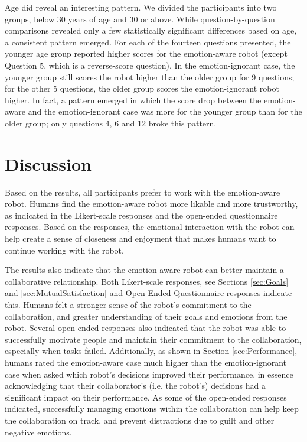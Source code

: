 \documentclass[12pt]{report}
\begin{document}
Age did reveal an interesting pattern. We divided the participants into two
groups, below 30 years of age and 30 or above. While question-by-question
comparisons revealed only a few statistically significant differences based on
age, a consistent pattern emerged. For each of the fourteen questions presented,
the younger age group reported higher scores for the emotion-aware robot (except
Question 5, which is a reverse-score question). In the emotion-ignorant case,
the younger group still scores the robot higher than the older group for 9
questions; for the other 5 questions, the older group scores the
emotion-ignorant robot higher. In fact, a pattern emerged in which the score
drop between the emotion-aware and the emotion-ignorant case was more for the
younger group than for the older group; only questions 4, 6 and 12 broke this
pattern.

\vspace*{-2mm}
\section{Discussion}
Based on the results, all participants prefer to work with the emotion-aware
robot. Humans find the emotion-aware robot more likable and more trustworthy, as
indicated in the Likert-scale responses and the open-ended questionnaire
responses. Based on the responses, the emotional interaction with the robot can
help create a sense of closeness and enjoyment that makes humans want to
continue working with the robot.

The results also indicate that the emotion aware robot can better maintain a
collaborative relationship. Both Likert-scale responses, see Sections \ref{sec:Goals}
and \ref{sec:MutualSatisfaction} and Open-Ended Questionnaire responses indicate
this. Humans felt a stronger sense of the robot's commitment to the
collaboration, and greater understanding of their goals and emotions from the
robot. Several open-ended responses also indicated that the robot was able to
successfully motivate people and maintain their commitment to the collaboration,
especially when tasks failed. Additionally, as shown in Section \ref{sec:Performance},
humans rated the emotion-aware case much higher than the emotion-ignorant case
when asked which robot's decisions improved their performance, in essence
acknowledging that their collaborator's (i.e. the robot's) decisions had a
significant impact on their performance. As some of the open-ended responses
indicated, successfully managing emotions within the collaboration can help keep
the collaboration on track, and prevent distractions due to guilt and other
negative emotions.
\end{document}
